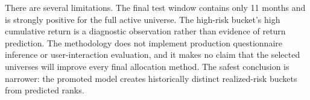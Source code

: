 There are several limitations. The final test window contains only 11 months and is strongly positive for the full active universe. The high-risk bucket's high cumulative return is a diagnostic observation rather than evidence of return prediction. The methodology does not implement production questionnaire inference or user-interaction evaluation, and it makes no claim that the selected universes will improve every final allocation method. The safest conclusion is narrower: the promoted model creates historically distinct realized-risk buckets from predicted ranks.
